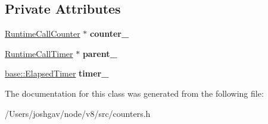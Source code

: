 \subsection*{Private Attributes}
\begin{DoxyCompactItemize}
\item 
\hyperlink{structv8_1_1internal_1_1_runtime_call_counter}{Runtime\+Call\+Counter} $\ast$ {\bfseries counter\+\_\+}\hypertarget{classv8_1_1internal_1_1_runtime_call_timer_adbf5c746af5c1bb144482ad3fe31769b}{}\label{classv8_1_1internal_1_1_runtime_call_timer_adbf5c746af5c1bb144482ad3fe31769b}

\item 
\hyperlink{classv8_1_1internal_1_1_runtime_call_timer}{Runtime\+Call\+Timer} $\ast$ {\bfseries parent\+\_\+}\hypertarget{classv8_1_1internal_1_1_runtime_call_timer_ab1ea2949828740cb443e4d35590132ca}{}\label{classv8_1_1internal_1_1_runtime_call_timer_ab1ea2949828740cb443e4d35590132ca}

\item 
\hyperlink{classv8_1_1base_1_1_elapsed_timer}{base\+::\+Elapsed\+Timer} {\bfseries timer\+\_\+}\hypertarget{classv8_1_1internal_1_1_runtime_call_timer_a86d12d73bc79cb2c90f9a2f545e603b5}{}\label{classv8_1_1internal_1_1_runtime_call_timer_a86d12d73bc79cb2c90f9a2f545e603b5}

\end{DoxyCompactItemize}


The documentation for this class was generated from the following file\+:\begin{DoxyCompactItemize}
\item 
/\+Users/joshgav/node/v8/src/counters.\+h\end{DoxyCompactItemize}
